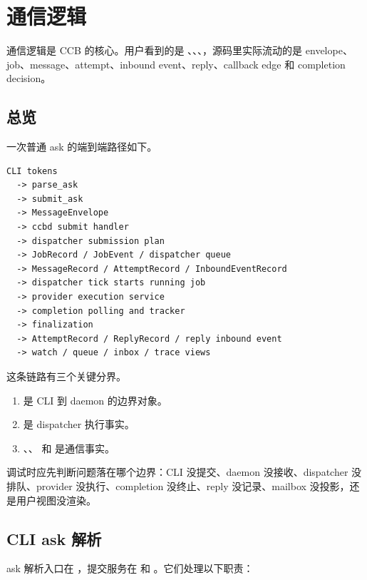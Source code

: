 \chapter{通信逻辑}

通信逻辑是 CCB 的核心。用户看到的是 、、、，源码里实际流动的是 envelope、job、message、attempt、inbound event、reply、callback edge 和 completion decision。

\section{总览}

一次普通 ask 的端到端路径如下。

\begin{Verbatim}[fontsize=\small,frame=single]
CLI tokens
  -> parse_ask
  -> submit_ask
  -> MessageEnvelope
  -> ccbd submit handler
  -> dispatcher submission plan
  -> JobRecord / JobEvent / dispatcher queue
  -> MessageRecord / AttemptRecord / InboundEventRecord
  -> dispatcher tick starts running job
  -> provider execution service
  -> completion polling and tracker
  -> finalization
  -> AttemptRecord / ReplyRecord / reply inbound event
  -> watch / queue / inbox / trace views
\end{Verbatim}

这条链路有三个关键分界。

\begin{enumerate}
  \item {} 是 CLI 到 daemon 的边界对象。
  \item {} 是 dispatcher 执行事实。
  \item {}、、 和  是通信事实。
\end{enumerate}

调试时应先判断问题落在哪个边界：CLI 没提交、daemon 没接收、dispatcher 没排队、provider 没执行、completion 没终止、reply 没记录、mailbox 没投影，还是用户视图没渲染。

\section{CLI ask 解析}

ask 解析入口在 ，提交服务在  和 。它们处理以下职责：

